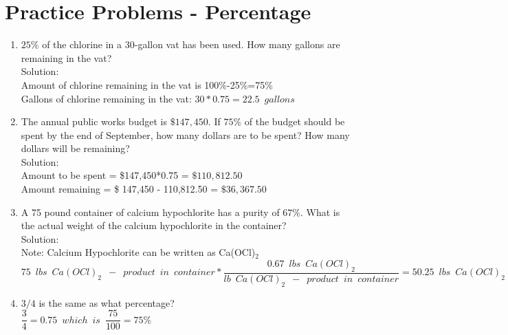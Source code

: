 \section*{Practice Problems - Percentage}


\begin{enumerate}
\item $25 \%$ of the chlorine in a 30-gallon vat has been used. How many gallons are remaining in the vat?\\
Solution:\\
Amount of chlorine remaining in the vat is 100\%-25\%=75\%\\

Gallons of chlorine remaining in the vat: $30*0.75=\boxed{22.5 \enspace gallons}$


\item The annual public works budget is $\$ 147,450$. If $75 \%$ of the budget should be spent by the end of September, how many dollars are to be spent? How many dollars will be remaining?\\
\vspace{0.2cm}
Solution:\\
Amount to be spent = \$147,450*0.75 = $\boxed{\$110,812.50}$\\
\vspace{0.2cm}
Amount remaining = \$ 147,450 - 110,812.50 = $\boxed{\$36,367.50}$

\item A 75 pound container of calcium hypochlorite has a purity of $67 \%$. What is the actual weight of the calcium hypochlorite in the container? \\
\vspace{0.2cm}
Solution:\\
Note: Calcium Hypochlorite can be written as Ca(OCl)$_2$\\
$75 \enspace lbs \enspace Ca(OCl)_2 \enspace - \enspace product \enspace in \enspace container*\dfrac{0.67 \enspace lbs \enspace Ca(OCl)_2 }{lb \enspace Ca(OCl)_2  \enspace - \enspace product \enspace in \enspace container} = \boxed{50.25 \enspace lbs \enspace Ca(OCl)_2}$\\
\vspace{0.2cm}


\item $3 / 4$ is the same as what percentage?\\
\vspace{0.2cm}
$\dfrac{3}{4}=0.75 \enspace which \enspace is \enspace \dfrac{75}{100} = \boxed{75\%}$\\
\vspace{0.2cm}
\end{enumerate}

